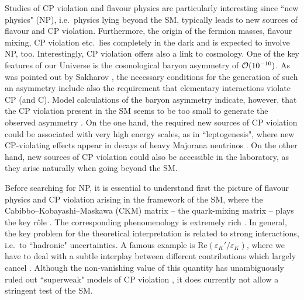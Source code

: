 \documentclass[12pt]{article}
\begin{document}
Studies of CP violation and flavour physics are particularly interesting since
``new physics" (NP), i.e.\ physics lying beyond the SM, typically leads to
new sources of flavour and CP violation. Furthermore, the origin of the
fermion masses, flavour mixing, CP violation etc.\ lies completely in the
dark and is expected to involve NP, too. Interestingly, CP violation
offers also a link to cosmology. One of the key features of our Universe is the
cosmological baryon asymmetry of ${\cal O}(10^{-10})$. As was pointed
out by Sakharov \cite{sach}, the necessary conditions for the generation of 
such an asymmetry include also the requirement that elementary interactions
violate CP (and C). Model calculations of the baryon asymmetry indicate, however,
that the CP violation present in the SM seems to be too small to generate
the observed asymmetry  \cite{shapos}. On the one hand, the required new sources 
of CP violation could be associated with very high energy scales, as in 
``leptogenesis", where new CP-violating effects appear in decays of heavy
Majorana neutrinos \cite{LG-rev}. On the other hand, new sources of
CP violation could also be accessible in the laboratory, as they arise 
naturally when going beyond the SM. 

Before searching for NP, it is essential to understand first the picture of
flavour physics and CP violation arising in the framework of the SM,
where the Cabibbo--Kobayashi--Maskawa (CKM) matrix -- the
quark-mixing matrix -- plays the key r\^ole \cite{cab,KM}. The 
corresponding phenomenology is extremely rich \cite{CKM-book}. In general,
the key problem for the theoretical interpretation is related to strong
interactions, i.e.\ to ``hadronic" uncertainties. A famous example is
$\mbox{Re}(\varepsilon_K'/\varepsilon_K)$, where we
have to deal with a subtle interplay between different contributions
which largely cancel \cite{epsp-rev}. Although the non-vanishing value of this
quantity has unambiguously ruled out ``superweak" models of
CP violation \cite{superweak}, it does currently not allow a stringent
test of the SM. 
\end{document}
